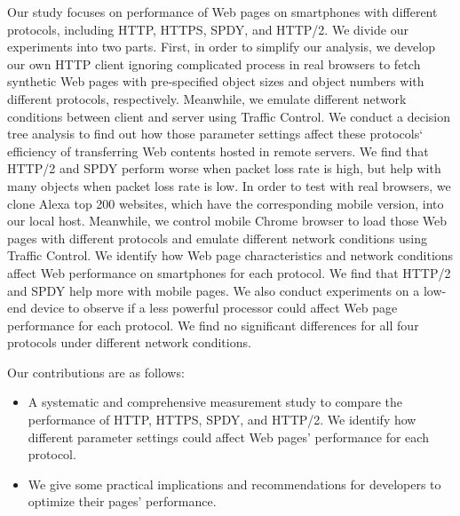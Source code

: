 Our study focuses on performance of Web pages on smartphones with different protocols, including HTTP, HTTPS, SPDY, and HTTP/2. We divide our experiments into two parts. First, in order to simplify our analysis, we develop our own HTTP client ignoring complicated process in real browsers to fetch synthetic Web pages with pre-specified object sizes and object numbers with different protocols, respectively. Meanwhile, we emulate different network conditions between client and server using Traffic Control. We conduct a decision tree analysis to find out how those parameter settings affect these protocols‘ efficiency of transferring Web contents hosted in remote servers. We find that HTTP/2 and SPDY perform worse when packet loss rate is high, but help with many objects when packet loss rate is low. In order to test with real browsers, we clone Alexa top 200 websites, which have the corresponding mobile version, into our local host. Meanwhile, we control mobile Chrome browser to load those Web pages with different protocols and emulate different network conditions using Traffic Control. We identify how Web page characteristics and network conditions affect Web performance on smartphones for each protocol. We find that HTTP/2 and SPDY help more with mobile pages. We also conduct experiments on a low-end device to observe if a less powerful processor could affect Web page performance for each protocol. We find no significant differences for all four protocols under different network conditions.

Our contributions are as follows:

\begin{itemize}
    \item{A systematic and comprehensive measurement study to compare the performance of HTTP, HTTPS, SPDY, and HTTP/2. We identify how different parameter settings could affect Web pages' performance for each protocol. }
    \item{We give some practical implications and recommendations for developers to optimize their pages' performance.}
\end{itemize}